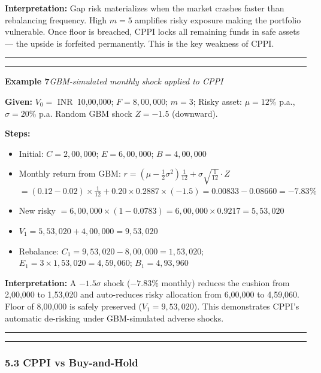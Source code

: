 \documentclass[
]{article}
\begin{document}
\noindent\textbf{Interpretation:} Gap risk materializes when the market crashes faster than rebalancing frequency. High $m=5$ amplifies risky exposure making the portfolio vulnerable. Once floor is breached, CPPI locks all remaining funds in safe assets --- the upside is forfeited permanently. This is the key weakness of CPPI.

\noindent\rule{\linewidth}{0.4pt}
\medskip
\noindent\rule{\linewidth}{0.4pt}
\noindent\textbf{Example 7}\enspace\textit{GBM-simulated monthly shock applied to CPPI}

\noindent\textbf{Given:} $V_0=$ INR~10{,}00{,}000; $F=8{,}00{,}000$; $m=3$; Risky asset: $\mu=12\%$ p.a., $\sigma=20\%$ p.a. Random GBM shock $Z=-1.5$ (downward).

\noindent\textbf{Steps:}
\begin{itemize}\setlength{\itemsep}{3pt}
  \item Initial: $C=2{,}00{,}000$; $E=6{,}00{,}000$; $B=4{,}00{,}000$
  \item Monthly return from GBM: $r = \left(\mu-\tfrac{1}{2}\sigma^2\right)\tfrac{1}{12}+\sigma\sqrt{\tfrac{1}{12}}\cdot Z$
        $= (0.12-0.02)\times\tfrac{1}{12}+0.20\times0.2887\times(-1.5) = 0.00833-0.08660 = -7.83\%$
  \item New risky $=6{,}00{,}000\times(1-0.0783)=6{,}00{,}000\times0.9217=5{,}53{,}020$
  \item $V_1=5{,}53{,}020+4{,}00{,}000=9{,}53{,}020$
  \item Rebalance: $C_1=9{,}53{,}020-8{,}00{,}000=1{,}53{,}020$; $E_1=3\times1{,}53{,}020=4{,}59{,}060$; $B_1=4{,}93{,}960$
\end{itemize}

\noindent\textbf{Interpretation:} A $-1.5\sigma$ shock ($-7.83\%$ monthly) reduces the cushion from 2{,}00{,}000 to 1{,}53{,}020 and auto-reduces risky allocation from 6{,}00{,}000 to 4{,}59{,}060. Floor of 8{,}00{,}000 is safely preserved ($V_1=9{,}53{,}020$). This demonstrates CPPI's automatic de-risking under GBM-simulated adverse shocks.

\noindent\rule{\linewidth}{0.4pt}
\medskip

\begin{center}\rule{0.5\linewidth}{0.5pt}\end{center}

\hypertarget{cppi-vs-buy-and-hold}{%
\subsubsection{5.3 CPPI vs Buy-and-Hold}\label{cppi-vs-buy-and-hold}}
\end{document}
